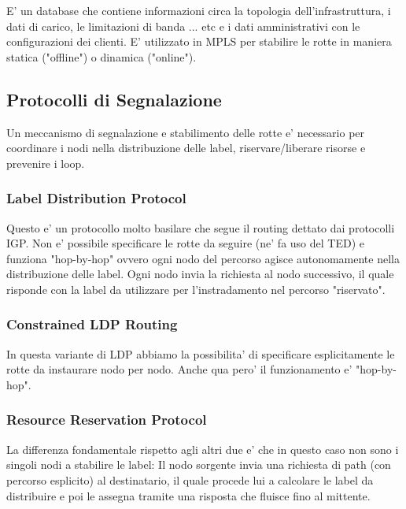 E' un database che contiene informazioni circa la topologia dell'infrastruttura, i dati di carico, le limitazioni di banda ... etc e i dati amministrativi con le configurazioni dei clienti. E' utilizzato in MPLS per stabilire le rotte in maniera statica ("offline") o dinamica ("online").


\subsection{Protocolli di Segnalazione}

Un meccanismo di segnalazione e stabilimento delle rotte e' necessario per coordinare i nodi nella distribuzione delle label, riservare/liberare risorse e prevenire i loop.

\subsubsection{Label Distribution Protocol}

Questo e' un protocollo molto basilare che segue il routing dettato dai protocolli IGP.
Non e' possibile specificare le rotte da seguire (ne' fa uso del TED) e funziona "hop-by-hop" ovvero ogni nodo del percorso agisce autonomamente nella distribuzione delle label.
Ogni nodo invia la richiesta al nodo successivo, il quale risponde con la label da utilizzare per l'instradamento nel percorso "riservato".


\subsubsection{Constrained LDP Routing}

In questa variante di LDP abbiamo la possibilita' di specificare esplicitamente le rotte da instaurare nodo per nodo.
Anche qua pero' il funzionamento e' "hop-by-hop".



\subsubsection{Resource Reservation Protocol}

La differenza fondamentale rispetto agli altri due e' che in questo caso non sono i singoli nodi a stabilire le label: Il nodo sorgente invia una richiesta di path (con percorso esplicito) al destinatario, il quale procede lui a calcolare le label da distribuire e poi le assegna tramite una risposta che fluisce fino al mittente.

